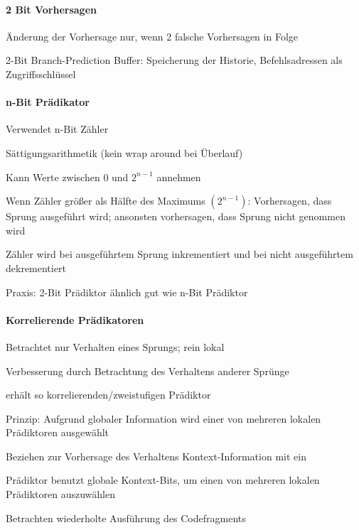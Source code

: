 \documentclass[10pt,landscape]{article}
\begin{document}
\begin{multicols}{3}
  \paragraph{2 Bit Vorhersagen}
  \begin{itemize*}
    \item Änderung der Vorhersage nur, wenn 2 falsche Vorhersagen in Folge
    \item 2-Bit Branch-Prediction Buffer: Speicherung der Historie, Befehlsadressen als Zugriffsschlüssel
  \end{itemize*}
  
  \paragraph{n-Bit Prädikator}
  \begin{itemize*}
    \item Verwendet n-Bit Zähler
    \item Sättigungsarithmetik (kein wrap around bei Überlauf)
    \item Kann Werte zwischen $0$ und $2^{n-1}$ annehmen
    \item Wenn Zähler größer als Hälfte des Maximums $(2^{n-1})$: Vorhersagen, dass Sprung ausgeführt wird; ansonsten vorhersagen, dass Sprung nicht genommen wird
    \item Zähler wird bei ausgeführtem Sprung inkrementiert und bei nicht ausgeführtem dekrementiert
    \item Praxis: 2-Bit Prädiktor ähnlich gut wie n-Bit Prädiktor
  \end{itemize*}
  
  \paragraph{Korrelierende Prädikatoren}
  \begin{itemize*}
    \item Betrachtet nur Verhalten eines Sprungs; rein lokal
    \item Verbesserung durch Betrachtung des Verhaltens anderer Sprünge
    \item erhält so korrelierenden/zweistufigen Prädiktor
    \item Prinzip: Aufgrund globaler Information wird einer von mehreren lokalen Prädiktoren ausgewählt
    \item Beziehen zur Vorhersage des Verhaltens Kontext-Information mit ein
    \item Prädiktor benutzt globale Kontext-Bits, um einen von mehreren lokalen Prädiktoren auszuwählen
    \item Betrachten wiederholte Ausführung des Codefragments
  \end{itemize*}
  

\end{multicols}
\end{document}
